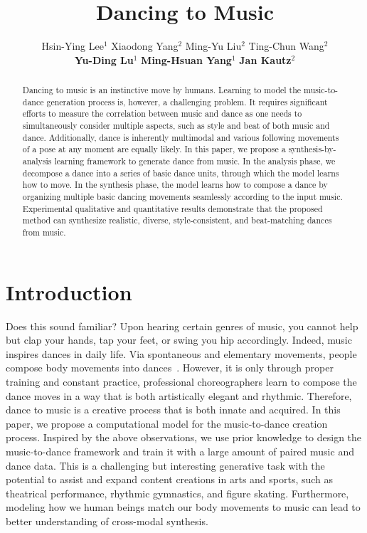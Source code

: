 \documentclass{article}
\newlength\secmargin
\begin{document}
\title{Dancing to Music}

\author{Hsin-Ying Lee$^1$ \quad Xiaodong Yang$^2$ \quad Ming-Yu Liu$^2$ \quad Ting-Chun Wang$^2$ 
\\ \textbf{Yu-Ding Lu}$^1$ \quad \textbf{Ming-Hsuan Yang}$^1$ \quad \textbf{Jan Kautz}$^2$ \\
}



\maketitle

\begin{abstract}
Dancing to music is an instinctive move by humans.
Learning to model the music-to-dance generation process is, however, a challenging problem. 
It requires significant efforts to measure the correlation between music and dance as one needs to simultaneously consider multiple aspects, such as style and beat of both music and dance.
Additionally, dance is inherently multimodal and various following movements of a pose at any moment are equally likely.
In this paper, we propose a synthesis-by-analysis learning framework to generate dance from music.
In the analysis phase, we decompose a dance into a series of basic dance units, through which the model learns how to move.
In the synthesis phase, the model learns how to compose a dance by organizing multiple basic dancing movements seamlessly according to the input music. 
Experimental qualitative and quantitative results demonstrate that the proposed method can synthesize realistic, diverse, style-consistent, and beat-matching dances from music.
\end{abstract}




\section{Introduction}
\label{sec:introduction}
\vspace{\secmargin}
Does this sound familiar? Upon hearing certain genres of music, you cannot help but clap your hands, tap your feet, or swing you hip accordingly. 
Indeed, music inspires dances in daily life.  
Via spontaneous and elementary movements, people compose body movements into dances~\cite{music-dance-1, music-dance-2}. 
However, it is only through proper training and constant practice, professional choreographers learn to compose the dance moves in a way that is both artistically elegant and rhythmic. 
Therefore, dance to music is a creative process that is both innate and acquired.
In this paper, we propose a computational model for the music-to-dance creation process. Inspired by the above observations, we use prior knowledge to design the music-to-dance framework and train it with a large amount of paired music and dance data.
This is a challenging but interesting generative task with the potential to assist and expand content creations in arts and sports, such as theatrical performance, rhythmic gymnastics, and figure skating. Furthermore, modeling how we human beings match our body movements to music can lead to better understanding of cross-modal synthesis. 
\end{document}
